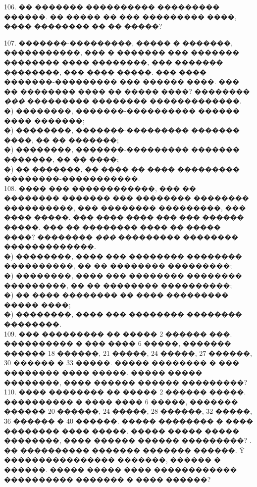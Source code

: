 \documentclass[12pt]{article}
\begin{document}
106. �� ������� ���������� ��������� ������. �� ����� �� ��� ��������� ����, ���� �������� �� �� �����?
\begin{center}
\begin{figure}[ht!]
\end{figure}
\end{center}
107. �������-���������, ����� � �������, �����������, ��� � ������� ��� ������� �������� ���� ��������, ��� ������� ��������, ��� ���� �����. ��� ���� �������-��������� ��� ������ ����. ��� �� �������� ���� �� ����� ����? �������� {\it ���} ��������� �������� �������������.\\
�) ��������, �������-���������� ������ ���� �������;\\
�) ��������, �������-��������� ������� ����, �� �� �������;\\
�) ��������, �������-��������� ������� �������, �� �� ����;\\
�) �� �������, �� ���� �� ���� ��������� ��������-�����������.\\
108. ���� ��� ������������, ��� �� �������� ������� ��� �������� �������� ����������, ��� �������� ���������, ��� ���� �����. ��� ���� ���� ��� ��� ������ �����. ��� �� �������� ���� �� ����� ����? �������� {\it ���} ��������� �������� �������������.\\
�) ��������, ���� ��� �������� �������� ����������, �� �� �������� ���������;\\
�) ��������, ���� ��� �������� �������� ���������, �� �� �������� ����������;\\
�) �� ���� �������� �� ���� ��������� ����� ����;\\
�) ��������, ���� ��� �������� �������� ��������.\\
109. ��� ��������� �� ����� 2 ������ ���. ���������� � ��� ���� 6 �����, ������� ������ 18 ������, 21 �����, 24 �����, 27 ������, 30 ������ � 33 �����. ����� �������� � ��� �������� ���� �����. ����� ����� ��������, ���� ������ ������ ���������?\\
110. ���� �������� �� ����� 2 ������ �����. ���������� � ���� ���� 6 �����, ������� ������ 20 ������, 24 �����, 28 ������, 32 �����, 36 ������ � 40 ������. ����� �������� � ���� �������� ���� �����. ����� ����� ����� ��������, ���� ������ ������ ���������?
\newpage
{}. �� ���������� ������� ������� ������. Ÿ ���������������� �������, ������ � ������. ����� ����� ���� ������������ ���������� ������� � ���� ������?
\begin{center}
\begin{figure}[ht!]
\end{figure}
\end{center}
\end{document}
